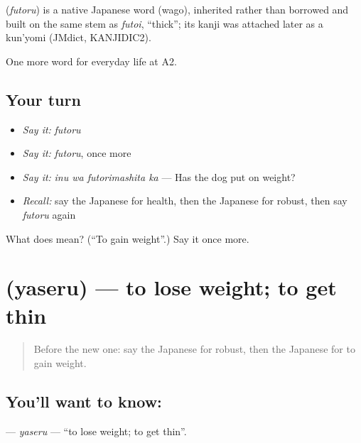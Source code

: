 \begin{cousinweb}
\textbf{} (\emph{futoru}) is a native Japanese word (wago), inherited rather than borrowed and built on the same stem as \emph{futoi}, \textquotedblleft{}thick\textquotedblright{}; its kanji was attached later as a kun'yomi (JMdict, KANJIDIC2).
\end{cousinweb}

\begin{grammarlens}[title={What you've built}]
One more word for everyday life at A2.
\end{grammarlens}

\subsection*{Your turn}
\begin{itemize}
\raggedright
  \item \emph{Say it:} \emph{futoru}
  \item \emph{Say it:} \emph{futoru}, once more
  \item \emph{Say it:} \emph{inu wa futorimashita ka} — Has the dog put on weight?
  \item \emph{Recall:} say the Japanese for health, then the Japanese for robust, then say \emph{futoru} again
\end{itemize}

\begin{tcolorbox}[breakable,colback=teal!4,colframe=teal!35!black,title={Before you move on}]
What does  mean? (\textquotedblleft{}To gain weight\textquotedblright{}.) Say it once more.
\end{tcolorbox}
\section[\texorpdfstring{\ja{やせる} (yaseru)}{やせる (yaseru)}]{ (yaseru) — to lose weight; to get thin}

\label{lesson:JA-C220-yaseru}



\begin{quote}
Before the new one: say the Japanese for robust, then the Japanese for to gain weight.
\end{quote}

\subsection*{You'll want to know: }
\textbf{} — \emph{yaseru} — \textquotedblleft{}to lose weight; to get thin\textquotedblright{}.

